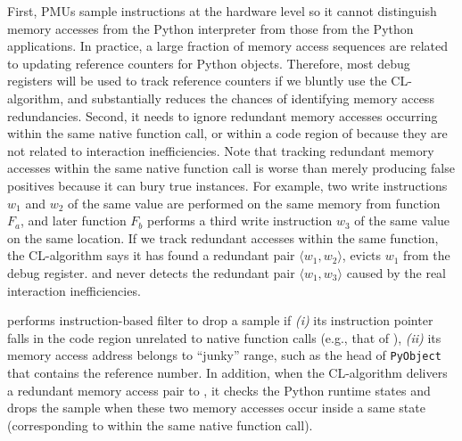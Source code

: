 First, PMUs sample instructions at the hardware level so it cannot distinguish memory accesses from the Python interpreter from those from the Python applications. In practice, a large fraction of memory access sequences are related to updating reference counters for Python objects. Therefore, most debug registers will be used to track reference counters if we bluntly use the CL-algorithm, and substantially reduces the chances of identifying memory access redundancies. Second, it needs to ignore redundant memory accesses occurring within the same native function call, or within a code region of \tool because they are not related to interaction inefficiencies. Note that tracking redundant memory accesses within the same native function call is worse than merely producing false positives because it can bury true instances. For example, two write instructions $w_1$ and $w_2$ of the same value are performed on the same memory from function $F_a$, and later function $F_b$ performs a third write instruction $w_3$ of the same value on the same location. If we track redundant accesses within the same function, the CL-algorithm says it has found a redundant pair $\langle w_1, w_2 \rangle$, evicts $w_1$ from the debug register. and never detects the redundant pair $\langle w_1, w_3 \rangle$ caused by the real interaction inefficiencies.





\tool performs instruction-based filter to drop a sample if \emph{(i)} its instruction pointer falls in the code region unrelated to native function calls (e.g., that of \tool), \emph{(ii)} its memory access address belongs to ``junky'' range, such as the head of {\tt PyObject} that contains the reference number. In addition, when the CL-algorithm delivers a redundant memory access pair to \tool, it checks the Python runtime states and drops the sample when these two memory accesses occur inside a same state (corresponding to within the same native function call).


